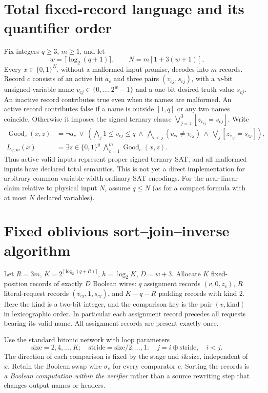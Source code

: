 \documentclass[11pt]{article}
\begin{document}
\section{Total fixed-record language and its quantifier order}
Fix integers $q\ge3$, $m\ge1$, and let
\[
 w=\lceil\log_2(q+1)\rceil,\qquad N=m[1+3(w+1)].
\]
Every $x\in\{0,1\}^N$, without a malformed-input promise, decodes into
$m$ records. Record $c$ consists of an active bit $a_c$ and three pairs
$(v_{cj},s_{cj})$, with a $w$-bit unsigned variable name
$v_{cj}\in\{0,\ldots,2^w-1\}$ and a one-bit desired truth value $s_{cj}$.
An inactive record contributes true even when its names are malformed.
An active record contributes false if a name is outside $[1,q]$ or any
two names coincide. Otherwise it imposes the signed ternary clause
$\bigvee_{j=1}^3[z_{v_{cj}}=s_{cj}]$.
Write
\[
 \begin{split}
 \operatorname{Good}_c(x,z)
 &=\neg a_c\ \vee\ \left(
 \bigwedge_j 1\le v_{cj}\le q\ \land\
 \bigwedge_{i<j}(v_{ci}\ne v_{cj})\ \land\
 \bigvee_j[z_{v_{cj}}=s_{cj}]\right),\\
 L_{q,m}(x)&=\exists z\in\{0,1\}^q\;
 \bigwedge_{c=1}^m\operatorname{Good}_c(x,z).
 \end{split}\tag{1}
\]
Thus active valid inputs represent proper signed ternary SAT, and all
malformed inputs have declared total semantics. This is not yet a direct
implementation for arbitrary common variable-width ordinary-SAT encodings.
For the near-linear claim relative to physical input $N$, assume
$q\le N$ (as for a compact formula with at most $N$ declared variables).

\section{Fixed oblivious sort--join--inverse algorithm}
Let $R=3m$, $K=2^{\lceil\log_2(q+R)\rceil}$,
$h=\log_2K$, $D=w+3$. Allocate $K$ fixed-position records of exactly
$D$ Boolean wires: $q$ assignment records $(v,0,z_v)$, $R$ literal-request
records $(v_{cj},1,s_{cj})$, and $K-q-R$ padding records with kind $2$.
Here the kind is a two-bit integer, and the comparison key is the pair
$(v,\text{kind})$ in lexicographic order. In particular each assignment
record precedes all requests bearing its valid name. All assignment records
are present exactly once.

Use the standard bitonic network with loop parameters
\[
 \text{size}=2,4,\ldots,K;\quad
 \text{stride}=\text{size}/2,\ldots,1;\quad
 j=i\oplus\text{stride},\quad i<j.
 \tag{2}
\]
The direction of each comparison is fixed by the stage and
$i\mathbin{\&}\text{size}$, independent of $x$. Retain the Boolean
swap wire $\sigma_e$ for every comparator $e$. Sorting the records is
\emph{a Boolean computation within the verifier} rather than a source
rewriting step that changes output names or headers.
\end{document}

